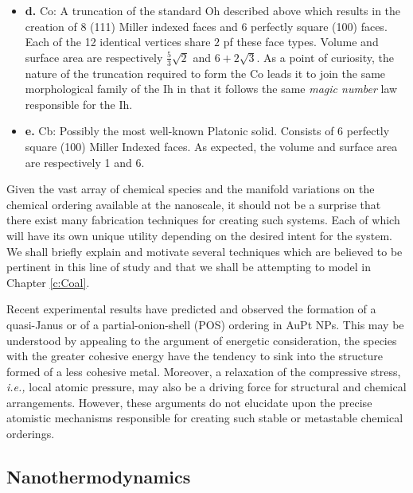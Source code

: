 \begin{itemize}
    \item \textbf{d.} Co: A truncation of the standard Oh described above which results in the creation of 8 (111) Miller indexed faces and 6 perfectly square (100) faces.  Each of the 12 identical vertices share $2$ pf these face types. Volume and surface area are respectively $\frac{5}{3}\sqrt{2}$ and $6+2\sqrt{3}$. As a point of curiosity, the nature of the truncation required to form the Co leads it to join the same morphological family of the Ih in that it follows the same \textit{magic number} law responsible for the Ih.
    \item \textbf{e.} Cb: Possibly the most well-known Platonic solid. Consists of 6 perfectly square (100) Miller Indexed faces. As expected, the volume and surface area are respectively 1 and 6.
    \label{list:nps}
\end{itemize}

Given the vast array of chemical species and the manifold variations on the chemical ordering available at the nanoscale, it should not be a surprise that there exist many fabrication techniques for creating such systems. Each of which will have its own unique utility depending on the desired intent for the system. We shall briefly explain and motivate several techniques which are believed to be pertinent in this line of study and that we shall be attempting to model in Chapter \ref{c:Coal}.

Recent experimental results \cite{Namsoon2021,Kummel2013,Deng2010,Erhart2018} have predicted and observed the formation of a quasi-Janus or of a partial-onion-shell (POS) ordering in AuPt NPs. This may be understood by appealing to the argument of energetic consideration, the species with the greater cohesive energy have the tendency to sink into the structure formed of a less cohesive metal. Moreover, a relaxation of the compressive stress, \textit{i.e.,} local atomic pressure\cite{Taran2020,Bochicchio2013}, may also be a driving force for structural and chemical arrangements. However, these arguments do not elucidate upon the precise atomistic mechanisms responsible for creating such stable or metastable chemical orderings.

\subsection{Nanothermodynamics}
\label{sec:nanotherm}

%
